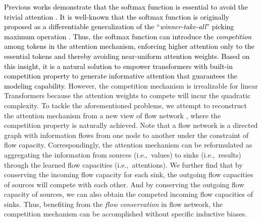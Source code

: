 \documentclass[nohyperref]{article}
\theoremstyle{plain}
\theoremstyle{definition}
\theoremstyle{remark}
\newcommand{\update}[1]{{\textcolor{black}{#1}}}
\begin{document}
\update{Previous works demonstrate that the softmax function is essential to avoid the trivial attention \cite{performer,Peng2021RandomFA}. It is well-known that the softmax function is originally proposed as a differentiable generalization of the ``\emph{winner-take-all}'' picking maximum operation \cite{Bridle1989TrainingSM}. Thus, the softmax function can introduce the \emph{competition} among tokens in the attention mechanism, enforcing higher attention only to the essential tokens and thereby avoiding near-uniform attention weights. Based on this insight, it is a natural solution to empower transformers with built-in competition property to generate informative attention that guarantees the modeling capability.} However, the competition mechanism is irrealizable for linear Transformers because the attention weights to compete will incur the quadratic complexity. To tackle the aforementioned problems, we attempt to reconstruct the attention mechanism from a new view of flow network \cite{Ahuja1993NetworkF}, where the competition property is naturally achieved. Note that a flow network is a directed graph with information flows from one node to another under the constraint of flow capacity. Correspondingly, the attention mechanism can be reformulated as aggregating the information from sources (i.e.,~values) to sinks (i.e.,~results) through the learned flow capacities (i.e.,~attentions). We further find that by conserving the incoming flow capacity for each sink, the outgoing flow capacities of sources will compete with each other. And by conserving the outgoing flow capacity of sources, we can also obtain the competed incoming flow capacities of sinks. Thus, benefiting from the \emph{flow conservation} in flow network, the competition mechanism can be accomplished without specific inductive biases.
\end{document}
